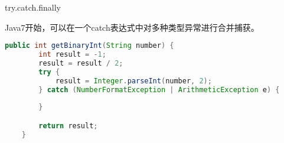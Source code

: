 try.catch.finally

Java7开始，可以在一个catch表达式中对多种类型异常进行合并捕获。

\begin{lstlisting}[language=java]
    public int getBinaryInt(String number) {
        int result = -1;
        result = result / 2;
        try {
            result = Integer.parseInt(number, 2);
        } catch (NumberFormatException | ArithmeticException e) {
                
        }

        return result;
    }
\end{lstlisting}


